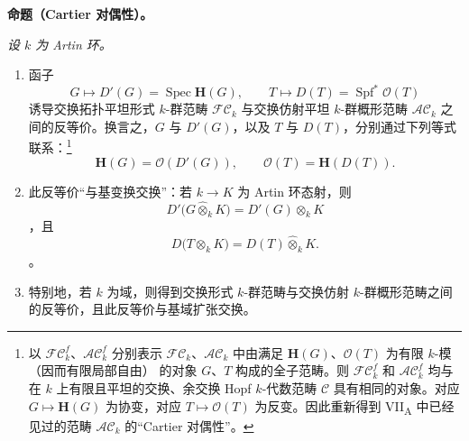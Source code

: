 \medskip\noindent\textbf{命题（Cartier 对偶性）。} \label{sga3:VIIB:2.2.2.prop}{\itshape 设 \(k\) 为 Artin 环。\begin{enumerate}\item[\textup{(i)}]函子 \[
  G\longmapsto D'(G)=\operatorname{Spec}\mathbf H(G),
  \qquad
  T\longmapsto D(T)=\operatorname{Spf}^*\mathcal O(T)
\] 诱导交换拓扑平坦形式 \(k\)-群范畴 \(\mathcal{FC}_k\) 与交换仿射平坦 \(k\)-群概形范畴 \(\mathcal{AC}_k\) 之间的反等价。换言之，\(G\) 与 \(D'(G)\)，以及 \(T\) 与 \(D(T)\)，分别通过下列等式联系：\footnote{\label{sga3:VIIB:nde:84}以 \(\mathcal{FC}_k^f\)、\(\mathcal{AC}_k^f\) 分别表示 \(\mathcal{FC}_k\)、\(\mathcal{AC}_k\) 中由满足 \(\mathbf H(G)\)、\(\mathcal O(T)\) 为有限 \(k\)-模 \textup{（因而有限局部自由）} 的对象 \(G\)、\(T\) 构成的全子范畴。则 \(\mathcal{FC}_k^f\) 和 \(\mathcal{AC}_k^f\) 均与在 \(k\) 上有限且平坦的交换、余交换 Hopf \(k\)-代数范畴 \(\mathcal C\) 具有相同的对象。对应 \(G\mapsto\mathbf H(G)\) 为协变，对应 \(T\mapsto\mathcal O(T)\) 为反变。因此重新得到 VII\textsubscript{A}  中已经见过的范畴 \(\mathcal{AC}_k\) 的“Cartier 对偶性”。}\[
  \mathbf H(G)=\mathcal O(D'(G)),
  \qquad
  \mathcal O(T)=\mathbf H(D(T)).
\]

\item[\textup{(ii)}]此反等价“与基变换交换”：若 \(k\to K\) 为 Artin 环态射，则 \[
  D'\bigl(G\widehat\otimes_kK\bigr)
  =
  D'(G)\otimes_kK
\]，且 \[
  D\bigl(T\otimes_kK\bigr)
  =
  D(T)\widehat\otimes_kK.
\]。

\item[\textup{(iii)}]特别地，若 \(k\) 为域，则得到交换形式 \(k\)-群范畴与交换仿射 \(k\)-群概形范畴之间的反等价，且此反等价与基域扩张交换。\end{enumerate}}


